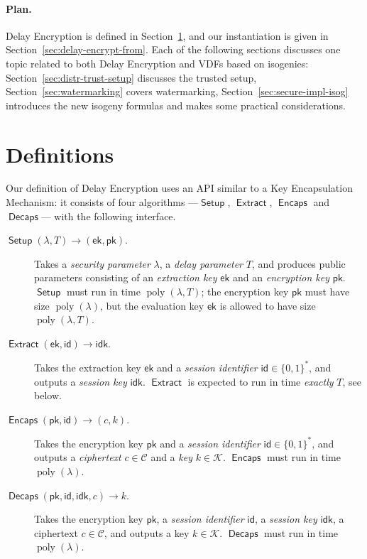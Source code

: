 \documentclass{llncs}
\DeclareMathOperator{\poly}{poly}
\DeclareMathOperator{\Setup}{\mathsf{Setup}}
\DeclareMathOperator{\Extract}{\mathsf{Extract}}
\DeclareMathOperator{\Encaps}{\mathsf{Encaps}}
\DeclareMathOperator{\Decaps}{\mathsf{Decaps}}
\newcommand{\ek}{\mathsf{ek}}
\newcommand{\pk}{\mathsf{pk}}
\newcommand{\id}{\mathsf{id}}
\newcommand{\idk}{\mathsf{idk}}
\newcommand{\keyspace}{\mathcal{K}}
\newcommand{\cipherspace}{\mathcal{C}}
\begin{document}
\paragraph{Plan.}
Delay Encryption is defined in Section~\ref{sec:definitions}, and our
instantiation is given in Section~\ref{sec:delay-encrypt-from}. %
Each of the following sections discusses one topic related to both
Delay Encryption and VDFs based on isogenies:
Section~\ref{sec:distr-trust-setup} discusses the trusted setup,
Section~\ref{sec:watermarking} covers watermarking,
Section~\ref{sec:secure-impl-isog} introduces the new isogeny formulas
and makes some practical considerations.


\section{Definitions}
\label{sec:definitions}

Our definition of Delay Encryption uses an API similar to a Key
Encapsulation Mechanism: it consists of four algorithms ---$\Setup$,
$\Extract$, $\Encaps$ and $\Decaps$--- with the following interface.

\begin{description}
\item[$\Setup(\lambda, T) \to (\ek,\pk)$.] %
  Takes a \emph{security parameter} $\lambda$, a \emph{delay
    parameter} $T$, and produces public parameters consisting of an
  \emph{extraction key} $\ek$ and an \emph{encryption key} $\pk$. %
  $\Setup$ must run in time $\poly(\lambda,T)$; the encryption key
  $\pk$ must have size $\poly(\lambda)$, but the evaluation key $\ek$
  is allowed to have size $\poly(\lambda,T)$.
\item[$\Extract(\ek,\id) \to \idk$.] %
  Takes the extraction key $\ek$ and a \emph{session identifier}
  $\id\in\{0,1\}^*$, and outputs a \emph{session key} $\idk$. %
  $\Extract$ is expected to run in time \emph{exactly} $T$, see below.
\item[$\Encaps(\pk,\id)\to (c,k)$.] %
  Takes the encryption key $\pk$ and a \emph{session identifier}
  $\id\in\{0,1\}^*$, and outputs a \emph{ciphertext}
  $c\in\cipherspace$ and a \emph{key} $k\in\keyspace$. %
  $\Encaps$ must run in time $\poly(\lambda)$.
\item[$\Decaps(\pk,\id,\idk,c)\to k$.] %
  Takes the encryption key $\pk$, a \emph{session identifier}
  $\id$, a \emph{session key} $\idk$, a ciphertext $c\in\cipherspace$,
  and outputs a key $k\in\keyspace$. %
  $\Decaps$ must run in time $\poly(\lambda)$.
\end{description}
\end{document}
